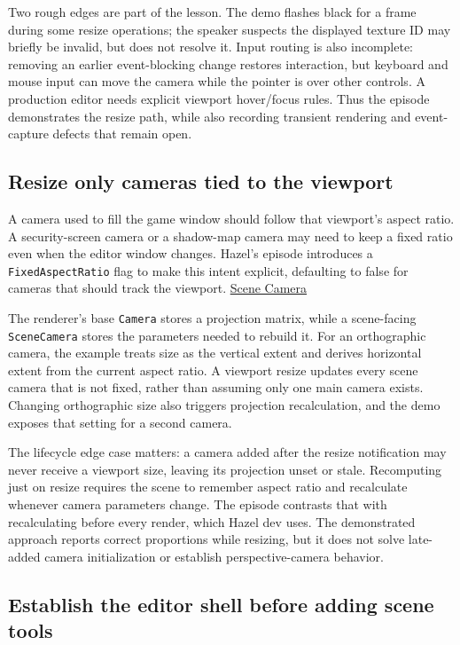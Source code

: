 Two rough edges are part of the lesson. The demo flashes black for a frame during some resize operations; the speaker suspects the displayed texture ID may briefly be invalid, but does not resolve it. Input routing is also incomplete: removing an earlier event-blocking change restores interaction, but keyboard and mouse input can move the camera while the pointer is over other controls. A production editor needs explicit viewport hover/focus rules. Thus the episode demonstrates the resize path, while also recording transient rendering and event-capture defects that remain open.

\subsection{Resize only cameras tied to the viewport}\label{06-engine-ii-ch032-resize-only-cameras-tied-to-the-viewport}

A camera used to fill the game window should follow that viewport's aspect ratio. A security-screen camera or a shadow-map camera may need to keep a fixed ratio even when the editor window changes. Hazel's episode introduces a \texttt{FixedAspectRatio} flag to make this intent explicit, defaulting to false for cameras that should track the viewport. \href{https://www.youtube.com/watch?v=UKVFRRufKzo}{Scene Camera}

The renderer's base \texttt{Camera} stores a projection matrix, while a scene-facing \texttt{SceneCamera} stores the parameters needed to rebuild it. For an orthographic camera, the example treats size as the vertical extent and derives horizontal extent from the current aspect ratio. A viewport resize updates every scene camera that is not fixed, rather than assuming only one main camera exists. Changing orthographic size also triggers projection recalculation, and the demo exposes that setting for a second camera.

The lifecycle edge case matters: a camera added after the resize notification may never receive a viewport size, leaving its projection unset or stale. Recomputing just on resize requires the scene to remember aspect ratio and recalculate whenever camera parameters change. The episode contrasts that with recalculating before every render, which Hazel dev uses. The demonstrated approach reports correct proportions while resizing, but it does not solve late-added camera initialization or establish perspective-camera behavior.

\subsection{Establish the editor shell before adding scene tools}\label{06-engine-ii-ch032-establish-the-editor-shell-before-adding-scene-tools}

